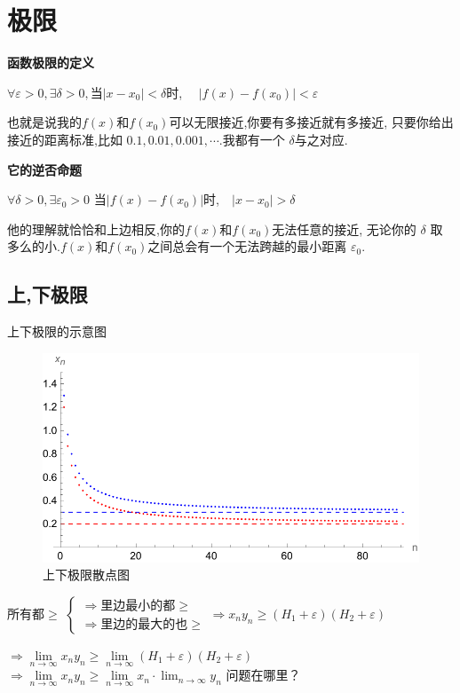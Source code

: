 \newpage
\section{极限}
\begin{definition}[极限定义]
    \textbf{\songti 函数极限的定义}\par
    $\forall \varepsilon>0, \exists \delta>0, 
    $当$|x-x_0|<\delta$时,~~ $\left|f(x)-f(x_0)\right|<\varepsilon$\par
    也就是说我的$f(x)$和$f(x_0)$可以无限接近,你要有多接近就有多接近,
    只要你给出接近的距离标准,比如 $0.1, 0.01, 0.001,\cdots$.我都有一个 $\delta$与之对应.\par
    
    \vspace*{2em}
    \textbf{\songti 它的逆否命题}\par
    $\forall \delta>0, \exists \varepsilon_0>0$
    当$\left|f(x)-f(x_0)\right|$时,~~$\left|x-x_0\right|>\delta$\par
    他的理解就恰恰和上边相反,你的$f(x)$和$f(x_0)$无法任意的接近,
    无论你的 $\delta$  取多么的小.$f(x)$和$f(x_0)$之间总会有一个无法跨越的最小距离 $\varepsilon_0$.
\end{definition}

\subsection{上,下极限}
上下极限的示意图

\begin{figure}[!htb]
    \centering
    \includegraphics[scale=1]{Chapter/TikZ/上下极限散点图.pdf}
    \caption{上下极限散点图}   
\end{figure}



所有都$\ge$
$    
\begin{cases}
    \Longrightarrow \text{里边最小的都}\ge\\ 
    \Longrightarrow \text{里边的最大的也}\ge 
\end{cases}
\Longrightarrow x_n y_n \ge (H_1+\varepsilon)(H_2 + \varepsilon)
$


$\Longrightarrow \lim\limits_{n\to \infty}{x_ny_n} \ge \lim\limits_{n\to \infty}{(H_1+\varepsilon)(H_2 + \varepsilon)}$
$\Longrightarrow \lim\limits_{n\to \infty}{x_n y_n }\ge \lim\limits_{n\to \infty}{x_n}\cdot \lim_{n\to \infty}{y_n}$
问题在哪里？


